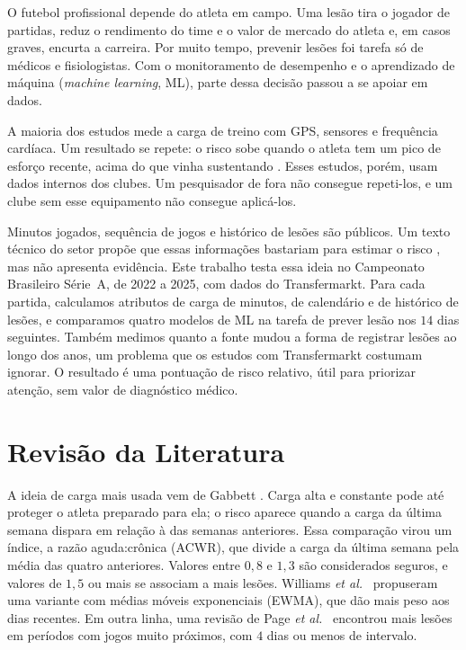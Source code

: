 \documentclass[conference]{IEEEtran}
\begin{document}
O futebol profissional depende do atleta em campo. Uma lesão tira o jogador de partidas, reduz o rendimento do time e o valor de mercado do atleta e, em casos graves, encurta a carreira. Por muito tempo, prevenir lesões foi tarefa só de médicos e fisiologistas. Com o monitoramento de desempenho e o aprendizado de máquina (\textit{machine learning}, ML), parte dessa decisão passou a se apoiar em dados.

A maioria dos estudos mede a carga de treino com GPS, sensores e frequência cardíaca. Um resultado se repete: o risco sobe quando o atleta tem um pico de esforço recente, acima do que vinha sustentando \cite{gabbett2016}. Esses estudos, porém, usam dados internos dos clubes. Um pesquisador de fora não consegue repeti-los, e um clube sem esse equipamento não consegue aplicá-los.

Minutos jogados, sequência de jogos e histórico de lesões são públicos. Um texto técnico do setor propõe que essas informações bastariam para estimar o risco \cite{jaja2026}, mas não apresenta evidência. Este trabalho testa essa ideia no Campeonato Brasileiro Série~A, de 2022 a 2025, com dados do Transfermarkt. Para cada partida, calculamos atributos de carga de minutos, de calendário e de histórico de lesões, e comparamos quatro modelos de ML na tarefa de prever lesão nos $14$ dias seguintes. Também medimos quanto a fonte mudou a forma de registrar lesões ao longo dos anos, um problema que os estudos com Transfermarkt costumam ignorar. O resultado é uma pontuação de risco relativo, útil para priorizar atenção, sem valor de diagnóstico médico.

\section{Revisão da Literatura}

A ideia de carga mais usada vem de Gabbett \cite{gabbett2016}. Carga alta e constante pode até proteger o atleta preparado para ela; o risco aparece quando a carga da última semana dispara em relação à das semanas anteriores. Essa comparação virou um índice, a razão aguda:crônica (ACWR), que divide a carga da última semana pela média das quatro anteriores. Valores entre $0{,}8$ e $1{,}3$ são considerados seguros, e valores de $1{,}5$ ou mais se associam a mais lesões. Williams \textit{et al.}~\cite{williams2017} propuseram uma variante com médias móveis exponenciais (EWMA), que dão mais peso aos dias recentes. Em outra linha, uma revisão de Page \textit{et al.}~\cite{page2023} encontrou mais lesões em períodos com jogos muito próximos, com $4$ dias ou menos de intervalo.
\end{document}
